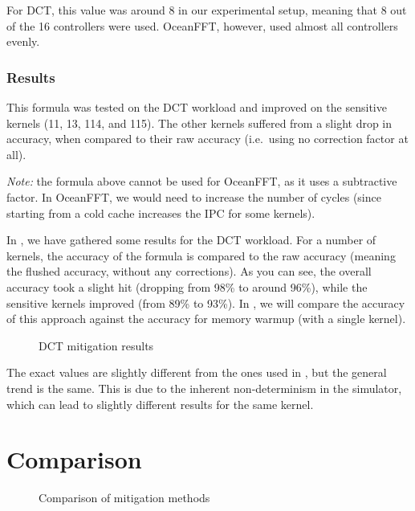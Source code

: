 For DCT, this value was around 8 in our experimental setup, meaning that 8 out of the 16 controllers were used.
OceanFFT, however, used almost all controllers evenly.

\subsubsection{Results}
This formula was tested on the DCT workload and improved on the sensitive kernels (11, 13, 114, and 115).
The other kernels suffered from a slight drop in accuracy, when compared to their raw accuracy (i.e.\ using no correction factor at all).

\textit{Note:} the formula above cannot be used for OceanFFT, as it uses a subtractive factor.
In OceanFFT, we would need to increase the number of cycles (since starting from a cold cache increases the IPC for some kernels).

In , we have gathered some results for the DCT workload.
For a number of kernels, the accuracy of the formula is compared to the raw accuracy (meaning the flushed accuracy, without any corrections).
As you can see, the overall accuracy took a slight hit (dropping from 98\% to around 96\%), while the sensitive kernels improved (from 89\% to 93\%).
In , we will compare the accuracy of this approach against the accuracy for memory warmup (with a single kernel).

\begin{figure}[h]
    \centering
    \caption{DCT mitigation results}
    \label{fig:dct-mitig}
\end{figure}

The exact values are slightly different from the ones used in , but the general trend is the same.
This is due to the inherent non-determinism in the simulator, which can lead to slightly different results for the same kernel.

\FloatBarrier
\section{Comparison}\label{sec:sim-vs-corr}
\begin{figure}[h]
    \centering
    \caption{Comparison of mitigation methods}
    \label{fig:mitig-compare}
\end{figure}

